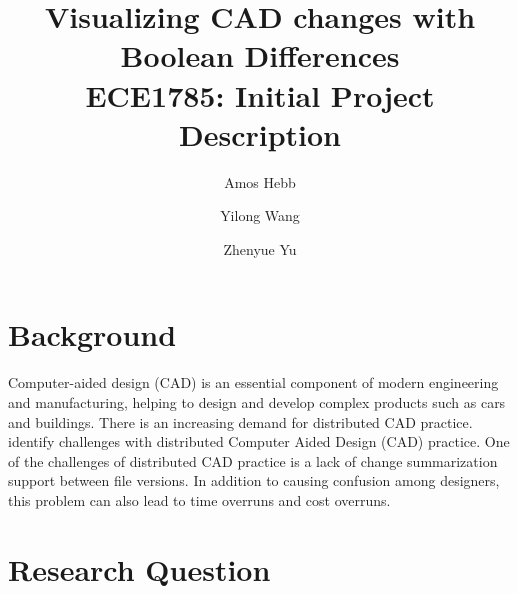 \documentclass[sigconf,]{acmart}
\begin{document}
\title{Visualizing CAD changes with Boolean Differences\\
{\normalsize ECE1785: Initial Project Description}}

\author{Amos Hebb}
\author{Yilong Wang}
\author{Zhenyue Yu}
\makeatother
\maketitle





\section{Background}

Computer-aided design (CAD) is an essential component of modern engineering and manufacturing, helping to design and develop complex products such as cars and buildings. There is an increasing demand for distributed CAD practice. \citet{cheng2023age} identify challenges with distributed Computer Aided Design (CAD) practice. One of the challenges of distributed CAD practice is a lack of change summarization support between file versions. In addition to causing confusion among designers, this problem can also lead to time overruns and cost overruns.

\section{Research Question}
\end{document}
